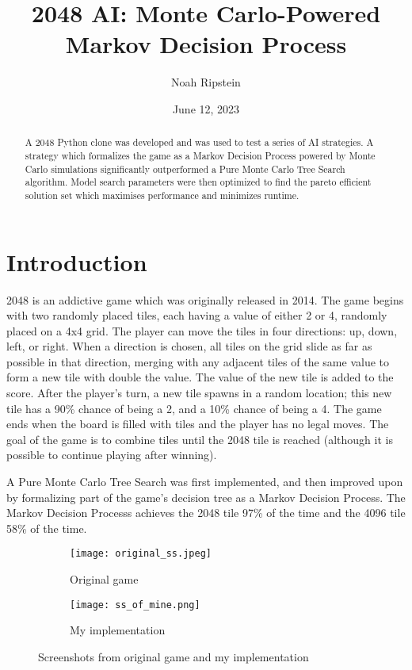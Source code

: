 \documentclass{article}
\title{2048 AI: Monte Carlo-Powered Markov Decision Process}
\author{Noah Ripstein}
\date{June 12, 2023}
\begin{document}
\maketitle


\begin{abstract}
A 2048 Python clone was developed and was used to test a series of AI strategies.  A strategy which formalizes the game as a Markov Decision Process powered by Monte Carlo simulations significantly outperformed a Pure Monte Carlo Tree Search algorithm.  Model search parameters were then optimized to find the pareto efficient solution set which maximises performance and minimizes runtime.
\end{abstract}

\section{Introduction}

2048 is an addictive game which was originally released in 2014.  The game begins with two randomly placed tiles, each having a value of either 2 or 4, randomly placed on a 4x4 grid. The player can move the tiles in four directions: up, down, left, or right. When a direction is chosen, all tiles on the grid slide as far as possible in that direction, merging with any adjacent tiles of the same value to form a new tile with double the value.  The value of the new tile is added to the score. After the player's turn,  a new tile spawns in a random location; this new tile has a 90\% chance of being a 2, and a 10\% chance of being a 4.   The game ends when the board is filled with tiles and the player has no legal moves.  The goal of the game is to combine tiles until the 2048 tile is reached (although it is possible to continue playing after winning).

A Pure Monte Carlo Tree Search was first implemented, and then improved upon by formalizing part of the game's decision tree as a Markov Decision Process.  The Markov Decision Processs achieves the 2048 tile 97\% of the time and the 4096 tile 58\% of the time. 



\begin{figure}[htbp]
  \centering
  \begin{subfigure}[b]{0.45\textwidth}
    \texttt{[image: original\_ss.jpeg]}
    \caption{Original game}
    \label{fig:original_ss}
  \end{subfigure}
  \hfill
  \begin{subfigure}[b]{0.45\textwidth}
    \texttt{[image: ss\_of\_mine.png]}
    \caption{My implementation}
    \label{fig:ss_of_mine}
  \end{subfigure}
  \caption{Screenshots from original game and my implementation}
  \label{fig:screenshots}
\end{figure}
\end{document}
